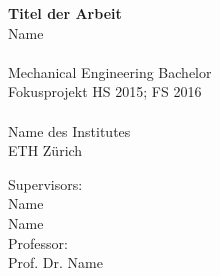 






\begin{titlepage}
\begin{center}
    \vspace*{1cm}
    {\huge \bfseries Titel der Arbeit \\ }
    \vspace{2cm}
    {\large 
	Name\\

	~\\
	Mechanical Engineering Bachelor\\
	\vspace{3.5cm}
	Fokusprojekt HS 2015; FS 2016\\
	~\\
	Name des Institutes\\
	ETH Zürich\\
    }




{\large
	Supervisors: \\[\baselineskip]
	Name\\
	Name\\[1cm]


	
	Professor:\\[\baselineskip]
	Prof. Dr. Name
}
\end{center}

\vspace*{2cm} %

\end{titlepage}




\begin{titlepage}
\thispagestyle{empty}
\newpage
\mbox{}
\end{titlepage}